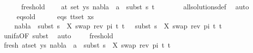 \begin{isabellebody}
\ \ \ \ \ \ fresh{\isacharunderscore}{\kern0pt}old{\isacharcolon}{\kern0pt}\isanewline
\ \ \ \ {\isachardoublequoteopen}{\isasymforall}{\isacharparenleft}{\kern0pt}a{\isacharcomma}{\kern0pt}t{\isacharparenright}{\kern0pt}{\isasymin}\ set\ ys{\isachardot}{\kern0pt}\ nabla{}\ {\isasymturnstile}\ a\ {\isasymsharp}\ subst\ s{}\ t{\isachardoublequoteclose}\isanewline
\ \ \ \ \ \ \isamarkupfalse%
\ all{\isacharunderscore}{\kern0pt}solutions{\isacharunderscore}{\kern0pt}def\ \isamarkupfalse%
\ auto\isanewline
\isanewline
\ \ \ \isamarkupfalse%
\ eqs{\isacharunderscore}{\kern0pt}old\ \isanewline
\ \ \ \isamarkupfalse%
\ eqs{\isacharcolon}{\kern0pt}\ {\isachardoublequoteopen}{\isasymforall}{\isacharparenleft}{\kern0pt}t{}{\isacharcomma}{\kern0pt}t{}{\isacharparenright}{\kern0pt}{\isasymin}set\ xs{\isachardot}{\kern0pt}\ \isanewline
\ \ \ \ nabla{}\ {\isasymturnstile}\ subst\ {\isacharparenleft}{\kern0pt}s{}\ {\isasymbullet}\ {\isacharbrackleft}{\kern0pt}{\isacharparenleft}{\kern0pt}X{\isacharcomma}{\kern0pt}\ swap\ {\isacharparenleft}{\kern0pt}rev\ pi{\isacharparenright}{\kern0pt}\ t{\isacharprime}{\kern0pt}{\isacharparenright}{\kern0pt}{\isacharbrackright}{\kern0pt}{\isacharparenright}{\kern0pt}\ t{}\ {\isasymapprox}\ \ subst\ {\isacharparenleft}{\kern0pt}s{}\ {\isasymbullet}\ {\isacharbrackleft}{\kern0pt}{\isacharparenleft}{\kern0pt}X{\isacharcomma}{\kern0pt}\ swap\ {\isacharparenleft}{\kern0pt}rev\ pi{\isacharparenright}{\kern0pt}\ t{\isacharprime}{\kern0pt}{\isacharparenright}{\kern0pt}{\isacharbrackright}{\kern0pt}{\isacharparenright}{\kern0pt}\ t{}{\isachardoublequoteclose}\isanewline
\ \ \ \ \isamarkupfalse%
\ unif{\isacharunderscore}{\kern0pt}{}a{\isacharbrackleft}{\kern0pt}OF\ subst{\isacharbrackright}{\kern0pt}\ \isamarkupfalse%
\ auto\isanewline
\isanewline
\ \ \ \isamarkupfalse%
\ fresh{\isacharunderscore}{\kern0pt}old\ \isanewline
\ \ \ \isamarkupfalse%
\ fresh{\isacharcolon}{\kern0pt}\ {\isachardoublequoteopen}{\isasymforall}{\isacharparenleft}{\kern0pt}a{\isacharcomma}{\kern0pt}t{\isacharparenright}{\kern0pt}{\isasymin}set\ ys{\isachardot}{\kern0pt}\ nabla{}\ {\isasymturnstile}\ a\ {\isasymsharp}\ subst\ {\isacharparenleft}{\kern0pt}s{}\ {\isasymbullet}\ {\isacharbrackleft}{\kern0pt}{\isacharparenleft}{\kern0pt}X{\isacharcomma}{\kern0pt}\ swap\ {\isacharparenleft}{\kern0pt}rev\ pi{\isacharparenright}{\kern0pt}\ t{\isacharprime}{\kern0pt}{\isacharparenright}{\kern0pt}{\isacharbrackright}{\kern0pt}{\isacharparenright}{\kern0pt}\ t{\isachardoublequoteclose}\isanewline

\end{isabellebody}

